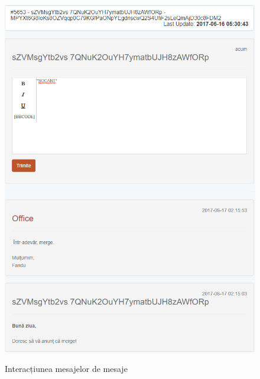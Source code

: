 \begin{figure}
{			\includegraphics[height=0.6\textheight, keepaspectratio]{../imagini/claim_mesaje.png}
			\label{fig:claim_mesaje}
		}
		\caption{Interacțiunea mesajelor de mesaje}
	\end{figure}

